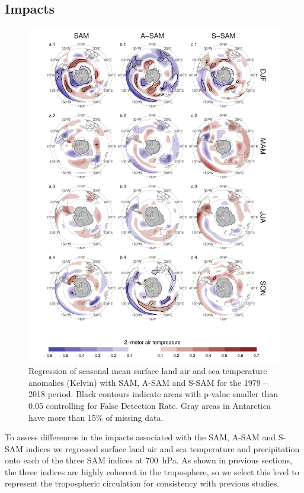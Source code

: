 \documentclass[smallextended]{svjour3}       %
\begin{document}
\hypertarget{impacts}{%
\subsection{Impacts}\label{impacts}}

\begin{figure}
\includegraphics{regr-air-season-1} \caption{Regression of seasonal mean surface land air and sea temperature anomalies (Kelvin) with SAM, A\nobreakdash-SAM and S\nobreakdash-SAM for the 1979 -- 2018 period. Black contours indicate areas with p-value smaller than 0.05 controlling for False Detection Rate. Gray areas in Antarctica have more than 15\% of missing data.}\label{fig:regr-air-season}
\end{figure}

To assess differences in the impacts associated with the SAM, A\nobreakdash-SAM and S\nobreakdash-SAM indices we regressed surface land air and sea temperature and precipitation onto each of the three SAM indices at 700~hPa. As shown in previous sections, the three indices are highly coherent in the troposphere, so we select this level to represent the tropospheric circulation for consistency with previous studies.
\end{document}
